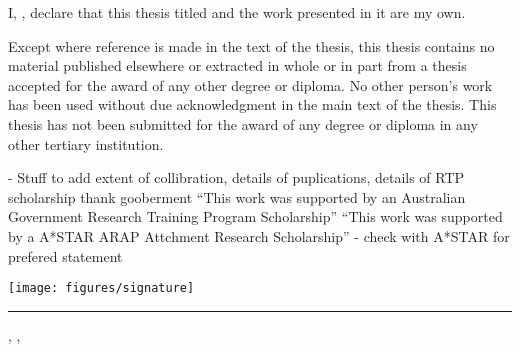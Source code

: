 
\noindent I, {\myFirstName} {\myLastName}, declare that this thesis titled \emph{\myTitle} and the work presented in it are my own. %

Except where reference is made in the text of the thesis, this thesis contains no material published elsewhere or extracted in whole or in part from a thesis accepted for the award of any other degree or diploma. No other person's work has been used without due acknowledgment in the main text of the thesis. This thesis has not been submitted for the award of any degree or diploma in any other tertiary institution.

- Stuff to add
extent of collibration,
details of puplications,
details of RTP scholarship thank gooberment “This work was supported
by an Australian
Government Research
Training Program
Scholarship”
“This work was supported
by a A*STAR ARAP Attchment Research
Scholarship” - check with A*STAR for prefered statement

\vspace{5em}


\noindent\hspace{0.5em}\texttt{[image: figures/signature]}\\
\noindent\rule[1em]{16.5em}{0.5pt}

\vspace{-1.5em}
\noindent {\myFirstName} {\myLastName} \hspace{12em} {\mySubmissionDay}, {\mySubmissionMonth}, {\mySubmissionYear}
